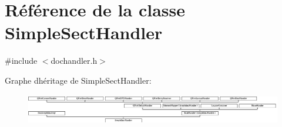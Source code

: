 \hypertarget{class_simple_sect_handler}{}\section{Référence de la classe Simple\+Sect\+Handler}
\label{class_simple_sect_handler}


{\ttfamily \#include $<$dochandler.\+h$>$}

Graphe d\textquotesingle{}héritage de Simple\+Sect\+Handler\+:\begin{figure}[H]
\begin{center}
\leavevmode
\includegraphics[height=1.338912cm]{class_simple_sect_handler}
\end{center}
\end{figure}
